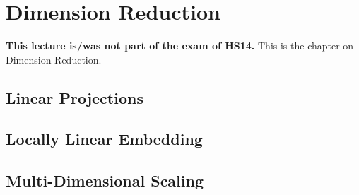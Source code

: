 \documentclass[MachineLearning]{subfiles}
\begin{document}

\section{Dimension Reduction}
\textbf{This lecture is/was not part of the exam of HS14.}
This is the chapter on Dimension Reduction.
\subsection{Linear Projections}
\subsection{Locally Linear Embedding}
\subsection{Multi-Dimensional Scaling}
\end{document}
